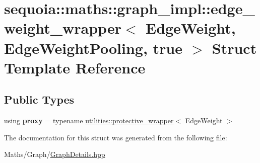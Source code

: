 \hypertarget{structsequoia_1_1maths_1_1graph__impl_1_1edge__weight__wrapper_3_01_edge_weight_00_01_edge_weight_pooling_00_01true_01_4}{}\section{sequoia\+::maths\+::graph\+\_\+impl\+::edge\+\_\+weight\+\_\+wrapper$<$ Edge\+Weight, Edge\+Weight\+Pooling, true $>$ Struct Template Reference}
\label{structsequoia_1_1maths_1_1graph__impl_1_1edge__weight__wrapper_3_01_edge_weight_00_01_edge_weight_pooling_00_01true_01_4}
\subsection*{Public Types}
\begin{DoxyCompactItemize}
\item 
\mbox{\label{structsequoia_1_1maths_1_1graph__impl_1_1edge__weight__wrapper_3_01_edge_weight_00_01_edge_weight_pooling_00_01true_01_4_a638861ccdb026caef749ff82e47789f3}} 
using {\bfseries proxy} = typename \mbox{\hyperlink{classsequoia_1_1utilities_1_1protective__wrapper}{utilities\+::protective\+\_\+wrapper}}$<$ Edge\+Weight $>$
\end{DoxyCompactItemize}


The documentation for this struct was generated from the following file\+:\begin{DoxyCompactItemize}
\item 
Maths/\+Graph/\mbox{\hyperlink{_graph_details_8hpp}{Graph\+Details.\+hpp}}\end{DoxyCompactItemize}
